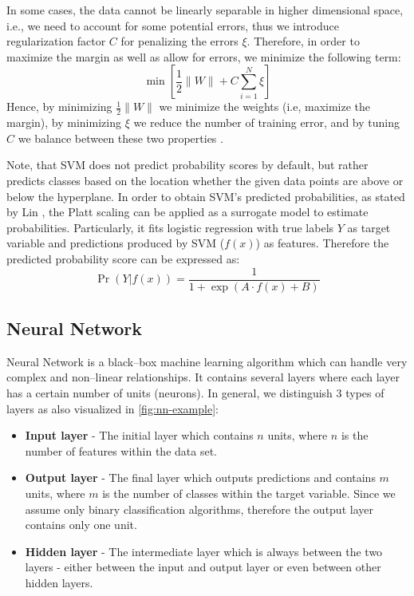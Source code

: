 In some cases, the data cannot be linearly separable in higher dimensional space, i.e., we need to account for some potential errors, thus we introduce regularization factor $C$  for penalizing the errors $\xi$.
Therefore, in order to maximize the margin as well as allow for errors, we minimize the following term:
\begin{equation}
    \min \left[\frac{1}{2} \|W\| + C \sum_{i=1}^{N} \xi\right]
\end{equation}
Hence, by minimizing $\frac{1}{2} \|W\|$ we minimize the weights (i.e, maximize the margin), by minimizing $\xi$ we reduce the number of training error, and by tuning $C$ we balance between these two properties \citep{hsu2002comparison}. 

Note, that SVM does not predict probability scores by default, but rather predicts classes based on the location whether the given data points are above or below the hyperplane.
In order to obtain SVM's predicted probabilities, as stated by Lin \citep{lin2007note}, the Platt scaling \citep{platt1999probabilistic} can be applied as a surrogate model to estimate probabilities. Particularly, it fits logistic regression with true labels $Y$ as target variable and predictions produced by SVM ($f(x)$) as features. Therefore the predicted probability score can be expressed as:
\begin{equation}
    \operatorname{Pr}\left(Y | f(x) \right) = \frac{1}{1 + \exp\left(A \cdot f(x) + B \right)} 
\end{equation}


\subsection{Neural Network}
\label{subssec:nn}
Neural Network is a black--box machine learning algorithm which can handle very complex and non--linear relationships. It contains several layers where each layer has a certain number of units (neurons). In general, we distinguish 3 types of layers as also visualized in \autoref{fig:nn-example}:
\begin{itemize}\setlength\itemsep{0em}
    \item \textbf{Input layer} - The initial layer which contains $n$ units, where $n$ is the number of features within the data set.
    \item \textbf{Output layer} - The final layer which outputs predictions and contains $m$ units, where $m$ is the number of classes within the target variable. Since we assume only binary classification algorithms, therefore the output layer contains only one unit.
    \item \textbf{Hidden layer} - The intermediate layer which is always between the two layers - either between the input and output layer or even between other hidden layers.
    \end{itemize}

